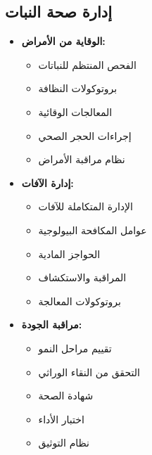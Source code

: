 \subsection{إدارة صحة النبات}
\begin{itemize}
    \item \textbf{الوقاية من الأمراض:}
    \begin{itemize}
        \item الفحص المنتظم للنباتات
        \item بروتوكولات النظافة
        \item المعالجات الوقائية
        \item إجراءات الحجر الصحي
        \item نظام مراقبة الأمراض
    \end{itemize}
    
    \item \textbf{إدارة الآفات:}
    \begin{itemize}
        \item الإدارة المتكاملة للآفات
        \item عوامل المكافحة البيولوجية
        \item الحواجز المادية
        \item المراقبة والاستكشاف
        \item بروتوكولات المعالجة
    \end{itemize}
    
    \item \textbf{مراقبة الجودة:}
    \begin{itemize}
        \item تقييم مراحل النمو
        \item التحقق من النقاء الوراثي
        \item شهادة الصحة
        \item اختبار الأداء
        \item نظام التوثيق
    \end{itemize}
\end{itemize}


